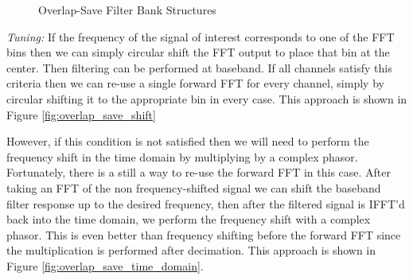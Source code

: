\documentclass[12pt]{report}
\begin{document}
\begin{figure}[h!]
\centerline{
    \hfill
}
\caption{Overlap-Save Filter Bank Structures}
\label{fig:overlap_save_filter_banks}
\end{figure}

\emph{Tuning:} If the frequency of the signal of interest corresponds to one of
the FFT bins then we can simply circular shift the FFT output to place that bin
at the center. Then filtering can be performed at baseband.  If all channels
satisfy this criteria then we can re-use a single forward FFT for every
channel, simply by circular shifting it to the appropriate bin in every case. This approach is shown in Figure \ref{fig:overlap_save_shift}

However, if this condition is not satisfied then we will need to perform the
frequency shift in the time domain by multiplying by a complex phasor.
Fortunately, there is a still a way to re-use the forward FFT in this case.
After taking an FFT of the non frequency-shifted signal we can shift the
baseband filter response up to the desired frequency, then after the filtered
signal is IFFT'd back into the time domain, we perform the frequency shift with
a complex phasor.  This is even better than frequency shifting before the
forward FFT since the multiplication is performed after decimation. This
approach is shown in Figure \ref{fig:overlap_save_time_domain}.
\end{document}

